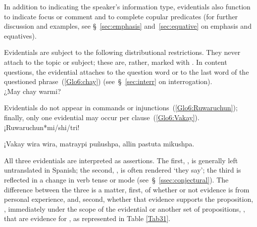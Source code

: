 In addition to indicating the speaker’s information type, evidentials also function to indicate focus or comment and to complete copular predicates (for further discussion and examples, see §~\ref{sec:emphasis} and~\ref{sec:equative} on emphasis and equatives).

Evidentials are subject to the following distributional restrictions. They never attach to the topic or subject; these are, rather, marked with . In content questions, the evidential attaches to the question word or to the last word of the questioned phrase~(\ref{Glo6:chay}) (see~§~\ref{sec:interr} on interrogation).\\

%
{¿May chay warmi?}%
{}%
{}{}%

\noindent
Evidentials do not appear in commands or injunctions~(\ref{Glo6:Ruwaruchun}); finally, only one evidential may occur per clause~(\ref{Glo6:Vakay}).\\

%
{¡Ruwaruchun*mi/shi/tri!}%
{}%
{}{}%

%
{¡Vakay wira wira, matraypi puñushpa, allin pastuta mikushpa.}%
{}%
{}{}%

All three evidentials are interpreted as assertions. The first, , is generally left untranslated in Spanish; the second, , is often rendered  ‘they say’; the third is reflected in a change in verb tense or mode (see~§~\ref{ssec:conjectural}). The difference between the three is a matter, first, of whether or not evidence is from personal experience, and, second, whether that evidence supports the proposition, , immediately under the scope of the evidential or another set of propositions, , that are evidence for , as represented in Table \ref{Tab31}.

